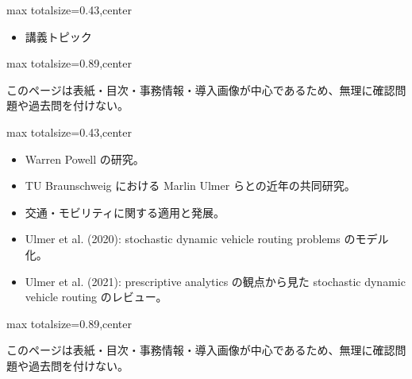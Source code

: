 \clearpage
{}
\begin{minipage}[t]{0.405\textwidth}
\begin{adjustbox}{max totalsize={\textwidth}{0.43\textheight},center}
\begin{minipage}{\textwidth}\scriptsize
{}\begin{itemize}
\item 講義トピック
\end{itemize}
\end{minipage}
\end{adjustbox}
\end{minipage}\hfill
\begin{minipage}[t]{0.58\textwidth}
\begin{adjustbox}{max totalsize={\textwidth}{0.89\textheight},center}
\begin{minipage}{\textwidth}\scriptsize
{}このページは表紙・目次・事務情報・導入画像が中心であるため、無理に確認問題や過去問を付けない。
\end{minipage}
\end{adjustbox}
\end{minipage}


\clearpage
{}
\begin{minipage}[t]{0.405\textwidth}
\begin{adjustbox}{max totalsize={\textwidth}{0.43\textheight},center}
\begin{minipage}{\textwidth}\scriptsize
{}\begin{itemize}
\item Warren Powell の研究。
\item TU Braunschweig における Marlin Ulmer らとの近年の共同研究。
\item 交通・モビリティに関する適用と発展。
\item Ulmer et al. (2020): stochastic dynamic vehicle routing problems のモデル化。
\item Ulmer et al. (2021): prescriptive analytics の観点から見た stochastic dynamic vehicle routing のレビュー。
\end{itemize}
\end{minipage}
\end{adjustbox}
\end{minipage}\hfill
\begin{minipage}[t]{0.58\textwidth}
\begin{adjustbox}{max totalsize={\textwidth}{0.89\textheight},center}
\begin{minipage}{\textwidth}\scriptsize
{}このページは表紙・目次・事務情報・導入画像が中心であるため、無理に確認問題や過去問を付けない。
\end{minipage}
\end{adjustbox}
\end{minipage}


